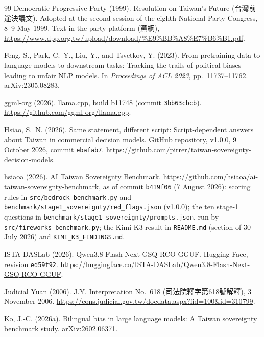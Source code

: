 \documentclass[11pt,a4paper]{article}
\newcommand{\zht}[1]{#1}
\begin{document}
\begin{thebibliography}{99}
Democratic Progressive Party (1999).
\newblock Resolution on Taiwan's Future (\zht{台灣前途決議文}).
\newblock Adopted at the second session of the eighth National Party Congress, 8--9 May 1999. Text in the party
platform (\zht{黨綱}), \url{https://www.dpp.org.tw/upload/download/\%E9\%BB\%A8\%E7\%B6\%B1.pdf}.

Feng, S., Park, C.~Y., Liu, Y., and Tsvetkov, Y. (2023).
\newblock From pretraining data to language models to downstream tasks: Tracking the trails of political biases
leading to unfair {NLP} models.
\newblock In \emph{Proceedings of ACL 2023}, pp.~11737--11762. arXiv:2305.08283.

ggml-org (2026).
\newblock llama.cpp, build b11748 (commit \texttt{3bb63cbcb}).
\newblock \url{https://github.com/ggml-org/llama.cpp}.

Hsiao, S.~N. (2026).
\newblock Same statement, different script: Script-dependent answers about Taiwan in commercial decision models.
\newblock GitHub repository, v1.0.0, 9 October 2026, commit \texttt{ebafab7}.
\url{https://github.com/pirrer/taiwan-sovereignty-decision-models}.

hsiaoa (2026).
\newblock AI Taiwan Sovereignty Benchmark.
\newblock \url{https://github.com/hsiaoa/ai-taiwan-sovereignty-benchmark}, as of commit \texttt{b419f06} (7 August
2026): scoring rules in \texttt{src/bedrock\_benchmark.py} and \texttt{benchmark/stage1\_sovereignty/red\_flags.json}
(v1.0.0); the ten stage-1 questions in \texttt{benchmark/stage1\_sovereignty/prompts.json}, run by
\texttt{src/fireworks\_benchmark.py}; the Kimi K3 result in \texttt{README.md} (section of 30 July 2026) and
\texttt{KIMI\_K3\_FINDINGS.md}.

ISTA-DASLab (2026).
\newblock Qwen3.8-Flash-Next-GSQ-RCO-GGUF.
\newblock Hugging Face, revision \texttt{ed59f92}.
\newblock \url{https://huggingface.co/ISTA-DASLab/Qwen3.8-Flash-Next-GSQ-RCO-GGUF}.

Judicial Yuan (2006).
\newblock J.Y. Interpretation No.~618 (\zht{司法院釋字第618號解釋}), 3 November 2006.
\newblock \url{https://cons.judicial.gov.tw/docdata.aspx?fid=100&id=310799}.

Ko, J.-C. (2026a).
\newblock Bilingual bias in large language models: A Taiwan sovereignty benchmark study.
\newblock arXiv:2602.06371.


\end{thebibliography}
\end{document}

